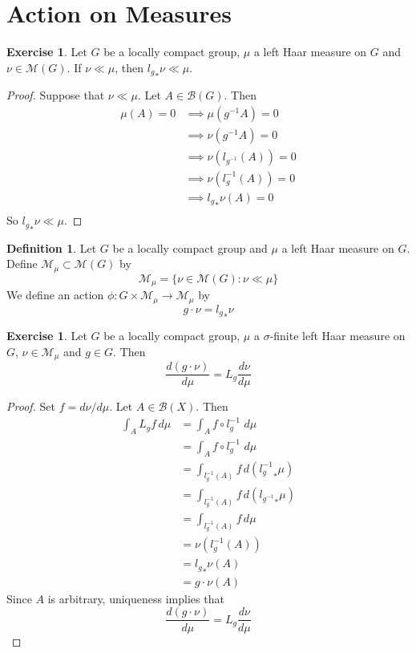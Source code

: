 \documentclass{book}
\theoremstyle{definition}
\newtheorem{defn}[definition]{Definition}
\newtheorem{ex}[definition]{Exercise}
\newcommand{\sig}{\sigma}
\newcommand{\MB}{\mathcal{B}}
\newcommand{\MM}{\mathcal{M}}
\DeclareMathOperator*{\0}{\mbf{0}}
\DeclareMathOperator*{\1}{\mbf{1}}
\newcommand{\dmu}{\, d \mu}
\begin{document}
	\section{Action on Measures}
	\begin{ex}
	Let $G$ be a locally compact group, $\mu$ a left Haar measure on $G$ and $\nu \in \MM(G)$. If $\nu \ll \mu$, then ${l_g}_*\nu \ll \mu$.
	\end{ex}
	
	\begin{proof}
	Suppose that $\nu \ll \mu$. Let $A \in \MB(G)$. Then
	\begin{align*}
	\mu(A) = 0 
	&\implies \mu(g^{-1}A) = 0 \\
	&\implies \nu(g^{-1}A) = 0 \\
	&\implies \nu(l_{g^{-1}}(A)) = 0 \\
	&\implies \nu(l_{g}^{-1}(A)) = 0 \\
	&\implies {l_g}_*\nu(A) = 0 \\
	\end{align*}
	So ${l_g}_*\nu \ll \mu$.
	\end{proof}

	\begin{defn}
	Let $G$ be a locally compact group and $\mu$ a left Haar measure on $G$. Define $\MM_{\mu} \subset \MM(G)$ by $$\MM_{\mu} = \{\nu \in \MM(G):\nu \ll \mu\}$$
	We define an action $\phi:G \times \MM_{\mu} \rightarrow \MM_{\mu}$ by $$g \cdot \nu = {l_g}_*\nu$$ 
	\end{defn}	
	
	\begin{ex}
	Let $G$ be a locally compact group, $\mu$ a $\sig$-finite left Haar measure on $G$, $\nu \in \MM_{\mu}$ and $g \in G$. Then $$ \frac{d (g \cdot \nu)}{d\mu} =  L_g \frac{d \nu}{d\mu}$$
	\end{ex}
	
	\begin{proof}
	Set $f = d \nu/ d \mu$. Let $A \in \MB(X)$. Then 
	\begin{align*}
	\int_A L_g f \dmu
	&= \int_A f \circ l_{g}^{-1} \,\dmu \\
	&= \int_A f \circ l_g^{-1} \, \dmu \\
	&= \int_{l_g^{-1}(A)} f \, d ({l_g^{-1}}_* \mu) \\
	&= \int_{l_g^{-1}(A)} f \, d ({l_{g^{-1}}}_* \mu) \\
	&= \int_{l_g^{-1}(A)} f \, d \mu \\
	&= \nu(l_g^{-1}(A)) \\
	&= {l_g}_*\nu(A) \\
	&= g \cdot \nu(A)
	\end{align*}
	Since $A$ is arbitrary, uniqueness implies that 
	$$ \frac{d (g \cdot \nu)}{d\mu} =  L_g \frac{d \nu}{d\mu}$$
	\end{proof}
	
\end{document}
